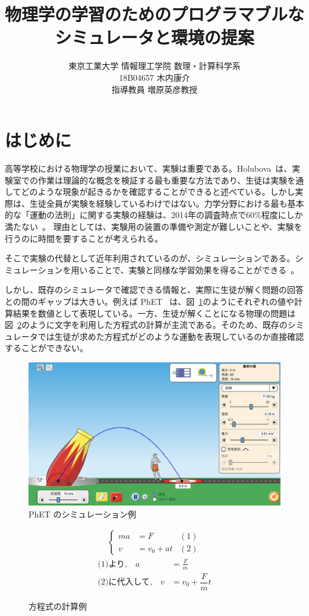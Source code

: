 \documentclass[11pt, a4paper, oneside, twocolumn, dvipdfmx]{jsarticle}
\title{物理学の学習のためのプログラマブルな
\\シミュレータと環境の提案}
\author{東京工業大学 情報理工学院 数理・計算科学系\\18B04657 木内康介\\指導教員 増原英彦教授}
\date{}
\begin{document}
\maketitle

\section{はじめに} \label{intro}
高等学校における物理学の授業において、実験は重要である。Holubova~\cite{holubova_2019}は、実験室での作業は理論的な概念を検証する最も重要な方法であり、生徒は実験を通してどのような現象が起きるかを確認することができると述べている。しかし実際は、生徒全員が実験を経験しているわけではない。力学分野における最も基本的な「運動の法則」に関する実験の経験は、2014年の調査時点で60\%程度にしか満たない~\cite{2015KJ00010038066}。
理由としては、実験用の装置の準備や測定が難しいことや、実験を行うのに時間を要することが考えられる。

そこで実験の代替として近年利用されているのが、シミュレーションである。シミュレーションを用いることで、実験と同様な学習効果を得ることができる~\cite{ajredini_real_2014}。

しかし、既存のシミュレータで確認できる情報と、実際に生徒が解く問題の回答との間のギャップは大きい。例えば PhET~\cite{perkins_phet_2006} は、図~\ref{numeral_based}のようにそれぞれの値や計算結果を数値として表現している。一方、生徒が解くことになる物理の問題は図~\ref{symbol_based}のように文字を利用した方程式の計算が主流である。そのため、既存のシミュレータでは生徒が求めた方程式がどのような運動を表現しているのか直接確認することができない。

\begin{figure}[hbt]
\centering
\includegraphics*[width=0.9\linewidth]{figure/PhET_example.png}
\caption{PhET のシミュレーション例} \label{numeral_based}
\end{figure}

\begin{figure}[hbt]
\begin{align}
  \left\{
  \begin{aligned}
    ma &= F & (1)\\
    v &= v_0 + at & (2)
  \end{aligned}
  \right. \nonumber
\end{align}
\begin{align}
  \text{(1)より,}\quad a &= \frac{F}{m} \nonumber\\
  \text{(2)に代入して,}\quad v &= v_0 + \dfrac{F}{m}t \nonumber
\end{align}
\caption{方程式の計算例} \label{symbol_based}
\end{figure}
\end{document}
